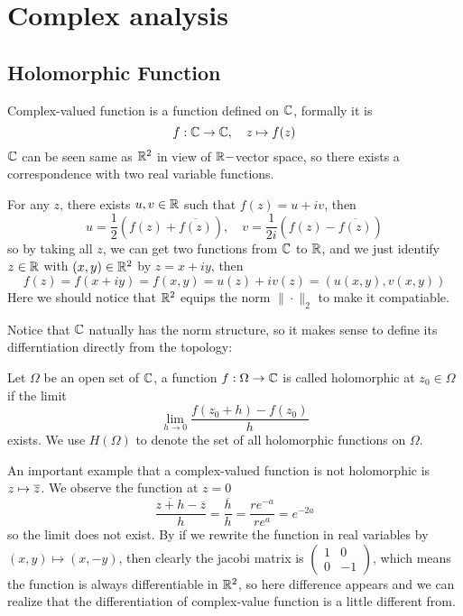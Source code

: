 \documentclass[en,geye,blue,pc,12pt]{elegantnote}
\begin{document}
\section{Complex analysis}
\subsection{Holomorphic Function}
Complex-valued function is a function defined on \(\mathbb{C}\), formally it is 
\[f: \mathbb{C} \to \mathbb{C} , \quad z \mapsto f(z)\]
\(\mathbb{C}\) can be seen same as \(\mathbb{R}^2\) in view of \(\mathbb{R}-\)vector space, so there exists a correspondence with two real variable functions.

For any \(z\), there exists \(u,v \in \mathbb{R}\) such that \(f(z) = u+iv\), then
\[u = \frac{1}{2}(f(z) + \overline{f(z)}),\quad v= \frac{1}{2i}(f(z)-\overline{f(z)})\]
so by taking all \(z\), we can get two functions from \(\mathbb{C} \) to \(\mathbb{R}\), and we just identify \(z \in \mathbb{R}\) with \((x,y) \in \mathbb{R}^2\) by \(z = x+iy\), then 
\[f(z) = f(x+iy) = f(x,y) = u(z)+iv(z) = (u(x,y),v(x,y))\]
Here we should notice that \(\mathbb{R}^2\) equips the norm \(\|\cdot\|_2\) to make it compatiable.

Notice that \(\mathbb{C}\) natually has the norm structure, so it makes sense to define its differntiation directly from the topology:
\begin{definition}
    Let \(\Omega\) be an open set of \( \mathbb{C}\), a function \(f: \Omega \to \mathbb{C}\) is called holomorphic at \(z_0 \in \Omega\) if the limit
    \[\lim_{h \rightarrow 0} \frac{f(z_0+h)-f(z_0)}{h}\]
    exists. We use \(H(\Omega)\) to denote the set of all holomorphic functions on \(\Omega\).
\end{definition}

\begin{example}
    An important example that a complex-valued function is not holomorphic is \(z \mapsto \overline{z}\). We observe the function at \(z=0\)
    \[\frac{\overline{z+h}-\overline{z}}{h} = \frac{\overline{h}}{h} = \frac{re^{-a}}{re^a}=e^{-2a}\]
    so the limit does not exist. By if we rewrite the function in real variables by \((x,y) \mapsto (x,-y)\), then clearly the jacobi matrix is \(\begin{pmatrix}
        1 &0 \\
        0 &-1
    \end{pmatrix}\), which means the function is always differentiable in \(\mathbb{R}^2\), so here difference appears and we can realize that the differentiation of complex-value function is a little different from.
\end{example}
\end{document}
